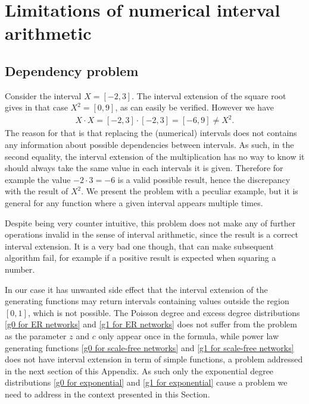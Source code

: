 \documentclass[
11pt, %
american, %
singlespacing, %
final, %
nolistspacing, %
liststotoc, %
headsepline, %
]{MastersDoctoralThesis} %
\begin{document}
\chapter{Limitations of numerical interval arithmetic}
\label{Appendix: Limitations of numerical interval arithmetic}

\section{Dependency problem}

Consider the interval $X = [-2, 3]$. The interval extension of the square root gives in that case $X^2 = [0, 9]$, as can easily be verified. However we have
\begin{align}
	X \cdot X = [-2, 3] \cdot [-2, 3] = [-6, 9] \neq X^2.
\end{align}
The reason for that is that replacing the (numerical) intervals does not contains any information about possible dependencies between intervals. As such, in the second equality, the interval extension of the multiplication has no way to know it should always take the same value in each intervals it is given. Therefore for example the value $-2 \cdot 3 = -6$ is a valid possible result, hence the discrepancy with the result of $X^2$. We present the problem with a peculiar example, but it is general for any function where a given interval appears multiple times.

Despite being very counter intuitive, this problem does not make any of further operations invalid in the sense of interval arithmetic, since the result is a correct interval extension. It is a very bad one though, that can make subsequent algorithm fail, for example if a positive result is expected when squaring a number.

In our case it has unwanted side effect that the interval extension of the generating functions may return intervals containing values outside the region $[0, 1]$, which is not possible. The Poisson degree and excess degree distributions \eqref{g0 for ER networks} and \eqref{g1 for ER networks} does not suffer from the problem as the parameter $z$ and $c$ only appear once in the formula, while power law generating functions \eqref{g0 for scale-free networks} and \eqref{g1 for scale-free networks} does not have interval extension in term of simple functions, a problem addressed in the next section of this Appendix. As such only the exponential degree distributions \eqref{g0 for exponential} and \eqref{g1 for exponential} cause a problem we need to address in the context presented in this Section.
\end{document}
